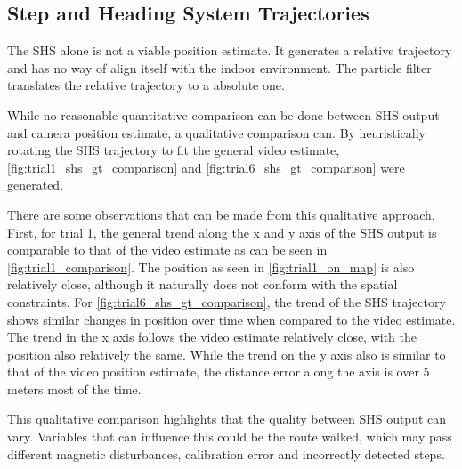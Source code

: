 \subsection{Step and Heading System Trajectories}

The \acl{SHS} alone is not a viable position estimate. It generates a relative trajectory and has no way of align itself with the indoor environment. The particle filter translates the relative trajectory to a absolute one.\par 

While no reasonable quantitative comparison can be done between \ac{SHS} output and camera position estimate, a qualitative comparison can. By heuristically rotating the SHS trajectory to fit the general video estimate, \cref{fig:trial1_shs_gt_comparison} and \cref{fig:trial6_shs_gt_comparison} were generated.\par 

There are some observations that can be made from this qualitative approach. First, for trial 1, the general trend along the x and y axis of the SHS output is comparable to that of the video estimate as can be seen in \cref{fig:trial1_comparison}. The position as seen in \cref{fig:trial1_on_map} is also relatively close, although it naturally does not conform with the spatial constraints. For \cref{fig:trial6_shs_gt_comparison}, the trend of the SHS trajectory shows similar changes in position over time when compared to the video estimate. The trend in the x axis follows the video estimate relatively close, with the position also relatively the same. While the trend on the y axis also is similar to that of the video position estimate, the distance error along the axis is over 5 meters most of the time. \par 

This qualitative comparison highlights that the quality between SHS output can vary. Variables that can influence this could be the route walked, which may pass different magnetic disturbances, calibration error and incorrectly detected steps.



